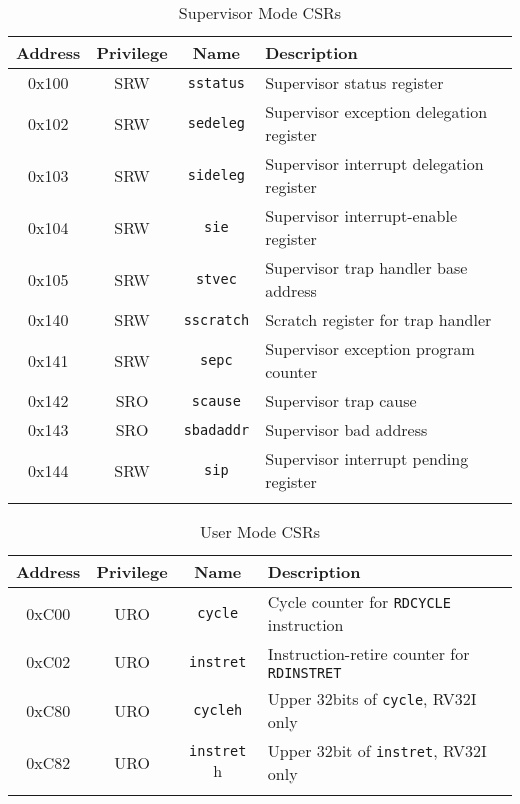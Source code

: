 





















































\begin{longtable}[]{@{}cccl@{}}
	\toprule
	\textbf{Address} & \textbf{Privilege} & \textbf{Name} & \textbf{Description}\tabularnewline
	\midrule

	\endhead



	0x100 & SRW & \texttt{sstatus} & Supervisor status register\tabularnewline
	0x102 & SRW & \texttt{sedeleg} & Supervisor exception delegation register\tabularnewline
	0x103 & SRW & \texttt{sideleg} & Supervisor interrupt delegation register\tabularnewline
	0x104 & SRW & \texttt{sie}     & Supervisor interrupt-enable register\tabularnewline
	0x105 & SRW & \texttt{stvec}   & Supervisor trap handler base address\tabularnewline


	0x140 & SRW & \texttt{sscratch} & Scratch register for trap handler\tabularnewline
	0x141 & SRW & \texttt{sepc}     & Supervisor exception program counter\tabularnewline
	0x142 & SRO & \texttt{scause}   & Supervisor trap cause\tabularnewline
	0x143 & SRO & \texttt{sbadaddr} & Supervisor bad address\tabularnewline
	0x144 & SRW & \texttt{sip}      & Supervisor interrupt pending register\tabularnewline
	\bottomrule
	\caption{Supervisor Mode CSRs}
	\label{tab:supervisor-csrs}
\end{longtable}


\begin{longtable}[]{@{}cccl@{}}
	\toprule
	\textbf{Address} & \textbf{Privilege} & \textbf{Name} & \textbf{Description}\tabularnewline
	\midrule

	\endhead



	0xC00 & URO & \texttt{cycle} & Cycle counter for \texttt{RDCYCLE} instruction\tabularnewline
	0xC02 & URO & \texttt{instret} & Instruction-retire counter for \texttt{RDINSTRET}\tabularnewline
	0xC80 & URO & \texttt{cycleh} & Upper 32bits of \texttt{cycle}, RV32I only\tabularnewline
	0xC82 & URO & \texttt{instret} h& Upper 32bit of \texttt{instret}, RV32I only\tabularnewline
	\bottomrule
	\caption{User Mode CSRs}
	\label{tab:user-csrs}
\end{longtable}

